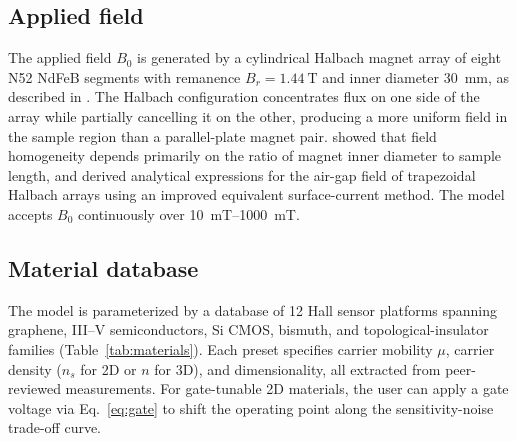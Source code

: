 \documentclass[pdflatex,sn-basic]{sn-jnl}
\theoremstyle{thmstyleone}
\theoremstyle{thmstyletwo}
\theoremstyle{thmstylethree}
\begin{document}
\subsection{Applied field}\label{sec:halbach}

The applied field $B_0$ is generated by a cylindrical Halbach magnet array of eight N52 NdFeB segments with remanence $B_r = \SI{1.44}{\tesla}$ and inner diameter \SI{30}{\milli\meter}, as described in \citet{govindaraju2025}. The Halbach configuration concentrates flux on one side of the array while partially cancelling it on the other, producing a more uniform field in the sample region than a parallel-plate magnet pair. \citet{klein2021} showed that field homogeneity depends primarily on the ratio of magnet inner diameter to sample length, and \citet{li2023halbach} derived analytical expressions for the air-gap field of trapezoidal Halbach arrays using an improved equivalent surface-current method. The model accepts $B_0$ continuously over \SIrange{10}{1000}{\milli\tesla}.

\subsection{Material database}\label{sec:materials}

The model is parameterized by a database of 12 Hall sensor platforms spanning graphene, III--V semiconductors, Si CMOS, bismuth, and topological-insulator families (Table~\ref{tab:materials}). Each preset specifies carrier mobility $\mu$, carrier density ($n_s$ for 2D or $n$ for 3D), and dimensionality, all extracted from peer-reviewed measurements. For gate-tunable 2D materials, the user can apply a gate voltage via Eq.~\eqref{eq:gate} to shift the operating point along the sensitivity-noise trade-off curve.
\end{document}
